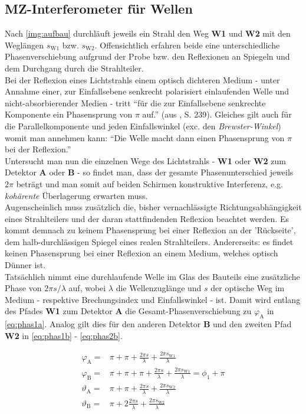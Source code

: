 \documentclass[numbers=noenddot,a4paper,notitlepage,twoside,BCOR15mm]{scrartcl}
\newcommand{\ix}[1]{_\text{#1}}
\newcommand{\tilt}[1]{\textit{#1}}
\newcommand{\fett}[1]{\textbf{#1}}
\begin{document}
\clearpage
			\subsection{MZ-Interferometer für Wellen}

				Nach \autoref{img:aufbau} durchläuft jeweils ein Strahl den Weg \fett{W1} und \fett{W2} mit den Weglängen $s\ix{W1}$ bzw. $s\ix{W2}$. Offensichtlich erfahren beide eine unterschiedliche Phasenverschiebung aufgrund der Probe bzw. den Reflexionen an Spiegeln und dem Durchgang durch die Strahlteiler.\\
				Bei der Reflexion eines Lichtstrahls einem optisch dichteren Medium - unter Annahme einer, zur Einfallsebene senkrecht polarisiert einlaufenden Welle und nicht-absorbierender Medien - tritt \enquote{für die zur Einfallsebene senkrechte Komponente ein Phasensprung von $\pi$ auf.} (aus \cite{MZdemt}, S. 239). Gleiches gilt auch für die Parallelkomponente und jeden Einfallswinkel (exc. den \tilt{Brewster-Winkel}) womit man annehmen kann: \enquote{Die Welle macht dann einen Phasensprung von $\pi$ bei der Reflexion.}\\
				Untersucht man nun die einzelnen Wege des Lichtstrahls - \fett{W1} oder \fett{W2} zum Detektor \fett{A} oder \fett{B} - so findet man, dass der gesamte Phasenunterschied jeweils $2\pi$ beträgt und man somit auf beiden Schirmen konstruktive Interferenz, e.g. \tilt{kohärente} Überlagerung  erwarten muss.\\
				Augenscheinlich muss zusätzlich die, bisher vernachlässigte Richtungsabhängigkeit eines Strahlteilers und der daran stattfindenden Reflexion beachtet werden. Es kommt demnach zu keinem Phasensprung bei einer Reflexion an der 'Rückseite', dem halb-durchlässigen Spiegel eines realen Strahlteilers. Andererseits: es findet keinen Phasensprung bei einer Reflexion an einem Medium, welches optisch Dünner ist.\\
				Tatsächlich nimmt eine durchlaufende Welle im Glas des Bauteils eine zusätzliche Phase von $2\pi s/\lambda$ auf, wobei $\lambda$ die Wellenzuglänge und $s$ der optische Weg im Medium - respektive Brechungsindex und Einfallswinkel - ist. Damit wird entlang des Pfades \fett{W1} zum Detektor \fett{A} die Gesamt-Phasenverschiebung zu $\varphi\ix{A}$ in \autoref{eq:phas1a}. Analog gilt dies für den anderen Detektor \fett{B} und den zweiten Pfad \fett{W2} in \autoref{eq:phas1b} - \autoref{eq:phas2b}.

					\begin{align}
						\varphi\ix{A}=&\pi+\pi+\frac{2\pi s}{\lambda}+\frac{2\pi s\ix{W1}}{\lambda} \label{eq:phas1a} \\
						\varphi\ix{B}=&\pi+\pi+\pi+\frac{2\pi s}{\lambda}+\frac{2\pi s\ix{W1}}{\lambda}=\phi\ix{1}+\pi \label{eq:phas1b} \\
						\vartheta\ix{A}=&\pi+\pi+\frac{2\pi s}{\lambda}+\frac{2\pi s\ix{W2}}{\lambda} \label{eq:phas2a} \\
						\vartheta\ix{B}=&\pi+2\frac{2\pi s}{\lambda}+\frac{2\pi s\ix{W2}}{\lambda} \label{eq:phas2b}
					\end{align}
\end{document}
